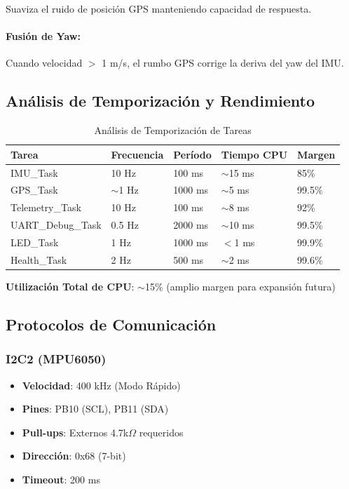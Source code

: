\documentclass[11pt,a4paper]{article}
\begin{document}
Suaviza el ruido de posición GPS manteniendo capacidad de respuesta.

\paragraph{Fusión de Yaw:}
Cuando velocidad $>$ 1 m/s, el rumbo GPS corrige la deriva del yaw del IMU.

\subsection{Análisis de Temporización y Rendimiento}

\begin{table}[H]
\centering
\begin{tabular}{@{}lllll@{}}
\toprule
\textbf{Tarea} & \textbf{Frecuencia} & \textbf{Período} & \textbf{Tiempo CPU} & \textbf{Margen} \\
\midrule
IMU\_Task & 10 Hz & 100 ms & $\sim$15 ms & 85\% \\
GPS\_Task & $\sim$1 Hz & 1000 ms & $\sim$5 ms & 99.5\% \\
Telemetry\_Task & 10 Hz & 100 ms & $\sim$8 ms & 92\% \\
UART\_Debug\_Task & 0.5 Hz & 2000 ms & $\sim$10 ms & 99.5\% \\
LED\_Task & 1 Hz & 1000 ms & $<$1 ms & 99.9\% \\
Health\_Task & 2 Hz & 500 ms & $\sim$2 ms & 99.6\% \\
\bottomrule
\end{tabular}
\caption{Análisis de Temporización de Tareas}
\end{table}

\textbf{Utilización Total de CPU}: $\sim$15\% (amplio margen para expansión futura)

\subsection{Protocolos de Comunicación}

\subsubsection{I2C2 (MPU6050)}
\begin{itemize}
    \item \textbf{Velocidad}: 400 kHz (Modo Rápido)
    \item \textbf{Pines}: PB10 (SCL), PB11 (SDA)
    \item \textbf{Pull-ups}: Externos 4.7k$\Omega$ requeridos
    \item \textbf{Dirección}: 0x68 (7-bit)
    \item \textbf{Timeout}: 200 ms
\end{itemize}
\end{document}
